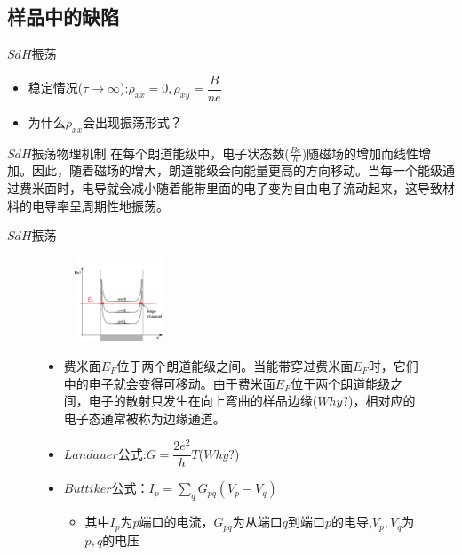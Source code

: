 \documentclass{beamer}
\begin{document}
\subsection{样品中的缺陷}
\begin{frame}{$SdH$振荡}
	\begin{itemize}
		\item 稳定情况($\tau \rightarrow \infty$):$\rho_{xx}=0,\rho_{xy}=\dfrac{B}{ne}$
		\item 为什么$\rho_{xx}$会出现振荡形式？
	\end{itemize}
\begin{block}{$SdH$振荡物理机制}
	在每个朗道能级中，电子状态数($\frac{Be}{h}$)随磁场的增加而线性增加。因此，随着磁场的增大，朗道能级会向能量更高的方向移动。当每一个能级通过费米面时，电导就会减小随着能带里面的电子变为自由电子流动起来，这导致材料的电导率呈周期性地振荡。
\end{block}
\end{frame}
\begin{frame}{$SdH$振荡}
	\begin{figure}[H]
	\begin{center}
		\includegraphics[width=4.5cm,height=2.5cm]{pic/9.png}
		\begin{itemize}
			\item 费米面$E_{F}$位于两个朗道能级之间。当能带穿过费米面$E_{F}$时，它们中的电子就会变得可移动。由于费米面$E_{F}$位于两个朗道能级之间，电子的散射只发生在向上弯曲的样品边缘($Why?$)，相对应的电子态通常被称为边缘通道。
			\item $Landauer$公式:$G=\dfrac{2e^{2}}{h}T$($Why?$)
			\item $Buttiker$公式：$I_{p}=\sum\limits_{q}G_{pq}(V_{p}-V_{q})$
			\begin{itemize}
				\item 其中$I_{p}$为$p$端口的电流，$G_{pq}$为从端口$q$到端口$p$的电导,$V_{p},V_{q}$为$p,q$的电压
			\end{itemize}
		\end{itemize}
	\end{center}
\end{figure}
\end{frame}
\end{document}
